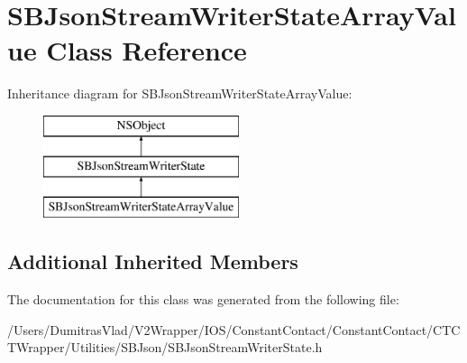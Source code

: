 \hypertarget{interface_s_b_json_stream_writer_state_array_value}{\section{S\-B\-Json\-Stream\-Writer\-State\-Array\-Value Class Reference}
\label{interface_s_b_json_stream_writer_state_array_value}
}
Inheritance diagram for S\-B\-Json\-Stream\-Writer\-State\-Array\-Value\-:\begin{figure}[H]
\begin{center}
\leavevmode
\includegraphics[height=3.000000cm]{interface_s_b_json_stream_writer_state_array_value}
\end{center}
\end{figure}
\subsection*{Additional Inherited Members}


The documentation for this class was generated from the following file\-:\begin{DoxyCompactItemize}
\item 
/\-Users/\-Dumitras\-Vlad/\-V2\-Wrapper/\-I\-O\-S/\-Constant\-Contact/\-Constant\-Contact/\-C\-T\-C\-T\-Wrapper/\-Utilities/\-S\-B\-Json/S\-B\-Json\-Stream\-Writer\-State.\-h\end{DoxyCompactItemize}
